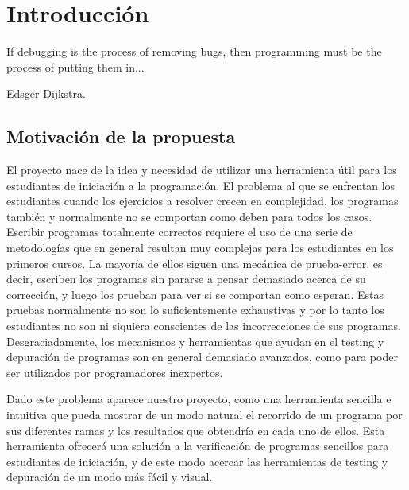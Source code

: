 %
%

\chapter{Introducci\'on}

\begin{FraseCelebre}
\begin{Frase}
If debugging is the process of removing bugs, then programming must be the process of putting them in...
\end{Frase}
\begin{Fuente}
Edsger Dijkstra.
\end{Fuente}
\end{FraseCelebre}

\section{Motivaci\'on de la propuesta}

El proyecto nace de la idea y necesidad de utilizar una herramienta \'util para los estudiantes de iniciaci\'on a la programaci\'on. El problema al que se enfrentan los estudiantes cuando los ejercicios a resolver crecen en complejidad, los programas tambi\'en y normalmente no se comportan como deben para todos los casos. Escribir programas totalmente correctos requiere el uso de una serie de metodolog\'ias que en general resultan muy complejas para los estudiantes en los primeros cursos. La mayor\'ia de ellos siguen una mec\'anica de prueba-error, es decir, escriben los programas sin pararse a pensar demasiado acerca de su correcci\'on, y luego los prueban para ver si se comportan como esperan. Estas pruebas normalmente no son lo suficientemente exhaustivas y por lo tanto los estudiantes no son ni siquiera conscientes de las incorrecciones de sus programas. Desgraciadamente, los mecanismos y herramientas que ayudan en el testing y depuraci\'on de programas son en general demasiado avanzados, como para poder ser utilizados por programadores inexpertos.

Dado este problema aparece nuestro proyecto, como una herramienta sencilla e intuitiva que pueda mostrar de un modo natural el recorrido de un programa por sus diferentes ramas y los resultados que obtendr\'ia en cada uno de ellos. Esta herramienta ofrecer\'a una soluci\'on a la verificaci\'on de programas sencillos para estudiantes de iniciaci\'on, y de este modo acercar las herramientas de testing y depuraci\'on de un modo m\'as f\'acil y visual.

